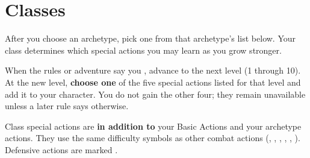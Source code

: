\onecolumn
\section{Classes}

After you choose an archetype, pick one  from that archetype's list below.
Your class determines which special actions you may learn as you grow stronger.

When the rules or adventure say you , advance to the next level (1 through 10).
At the new level, \textbf{choose one} of the five special actions listed for that level and add it to your character.
You do not gain the other four; they remain unavailable unless a later rule says otherwise.

Class special actions are \textbf{in addition to} your Basic Actions and your archetype actions.
They use the same difficulty symbols as other combat actions (\easy, \medium{} , \hard{} \hard{}, \grand, \dire, \fell).
Defensive actions are marked .





\clearpage
\twocolumn
